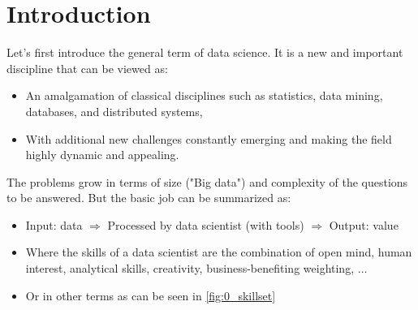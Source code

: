\section*{Introduction}
\setcounter{figure}{0}

Let's first introduce the general term of data science. It is a new and important discipline that can be viewed as:
\begin{itemize}
  \item An amalgamation of classical disciplines such as statistics, data mining, databases, and distributed systems,
  \item With additional new challenges constantly emerging and making the field highly dynamic and appealing.
\end{itemize} 
The problems grow in terms of size ("Big data") and complexity of the questions to be answered. But the basic job can be summarized as:
\begin{itemize}
  \item Input: data $\Rightarrow$ Processed by data scientist (with tools) $\Rightarrow$ Output: value
  \item Where the skills of a data scientist are the combination of open mind, human interest, analytical skills, creativity, business-benefiting weighting, $\dots$
  \item Or in other terms as can be seen in \ref{fig:0_skillset}
\end{itemize}

